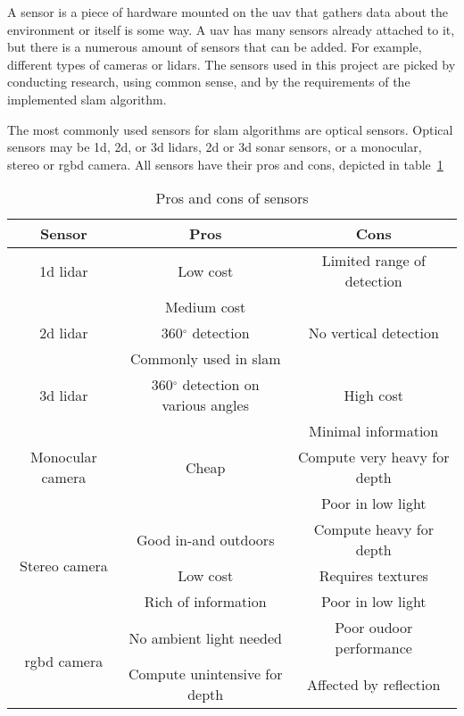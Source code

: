 A sensor is a piece of hardware mounted on the \acs{uav} that gathers data about the environment or itself is some way. A \acs{uav} has many sensors already attached to it, but there is a numerous amount of sensors that can be added. For example, different types of cameras or \acsp{lidar}. The sensors used in this project are picked by conducting research, using common sense, and by the requirements of the implemented \acs{slam} algorithm.

The most commonly used sensors for \acs{slam} algorithms are optical sensors. Optical sensors may be \acs{1d}, \acs{2d}, or \acs{3d} \acsp{lidar}, \acs{2d} or \acs{3d} sonar sensors, or a monocular, stereo or \acs{rgbd} camera. All sensors have their pros and cons, depicted in table~\ref{tab:sensors} \cite{slam_sensor_handover}

\begin{table}[!h]
  \centering
  \begin{tabular}{| c | c | c |}
    \hline
    \textbf{Sensor} & \textbf{Pros} & \textbf{Cons}\\
    \hline
    \acs{1d} \acs{lidar} & Low cost & Limited range of detection\\
    \hline
    \multirow{3}{*}{\acs{2d} \acs{lidar}} & Medium cost & \multirow{3}{*}{No vertical detection}\\
    & 360$^{\circ}$ detection &\\
    & Commonly used in \acs{slam} &\\
    \hline
    \acs{3d} \acs{lidar} & 360$^{\circ}$ detection on various angles & High cost\\
    \hline
    \multirow{3}{*}{Monocular camera} & \multirow{3}{*}{Cheap} & Minimal information\\
    & & Compute very heavy for depth\\
    & & Poor in low light\\
    \hline
    \multirow{3}{*}{Stereo camera} & Good in\hyp{}and outdoors & Compute heavy for depth\\
    & Low cost & Requires textures \\
    & Rich of information & Poor in low light \\
    \hline
    \multirow{2}{*}{\acs{rgbd} camera} & No ambient light needed & Poor oudoor performance\\
    & Compute unintensive for depth & Affected by reflection\\
    \hline
  \end{tabular}
  \caption{Pros and cons of sensors \cite{3d_camera}}
  \label{tab:sensors}
\end{table}
